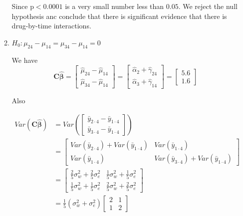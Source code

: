 \documentclass{article}
\begin{document}
\begin{enumerate}[leftmargin = 0 em, label = \arabic*., font = \bfseries]
\begin{enumerate}
		Since p$< 0.0001$ is a very small number less than $0.05$. We reject the null hypothesis anc conclude that there is significant evidence that there is drug-by-time interactions. 

		\item 
		$H_0 : \mu_{24} - \mu_{14} = \mu_{34} - \mu_{14} = 0$

		We have
		\[\bm C \hat{\bm \beta} = \begin{bmatrix}
			\hat{\mu}_{24} - \hat{\mu}_{14} \\
			\hat{\mu}_{34} - \hat{\mu}_{14}
		\end{bmatrix}  =\begin{bmatrix}
			\hat{\alpha}_2 + \hat{\gamma}_{24}\\
			\hat{\alpha}_3 + \hat{\gamma}_{14}
		\end{bmatrix} = \begin{bmatrix}
			5.6 \\ 1.6
		\end{bmatrix}\]

		Also

		\begin{align*}
		Var \left( \bm C \hat{\bm \beta}\right) & = Var \left(  \begin{bmatrix}
			\bar{y}_{2 \cdot 4} - \bar{y}_{1 \cdot 4}\\
			\bar{y}_{3 \cdot 4} - \bar{y}_{1 \cdot 4}
		\end{bmatrix} \right)  \\
		& = \begin{bmatrix}
			Var(\bar{y}_{2 \cdot 4}) + Var(\bar{y}_{1 \cdot 4}) & Var(\bar{y}_{1 \cdot 4})\\
			Var(\bar{y}_{1 \cdot 4}) & Var(\bar{y}_{3 \cdot 4}) + Var(\bar{y}_{1 \cdot 4})
		\end{bmatrix}\\
		& = \begin{bmatrix}
			\frac{2}{5} \sigma_w^2 + \frac{2}{5} \sigma_e^2 & \frac{1}{5} \sigma_w^2 + \frac{1}{5} \sigma_e^2\\
			\frac{1}{5} \sigma_w^2 + \frac{1}{5} \sigma_e^2 & \frac{2}{5} \sigma_w^2 + \frac{2}{5} \sigma_e^2 
		\end{bmatrix}\\
		& = \frac{1}{5} (\sigma_w^2 + \sigma_e^2) \begin{bmatrix}
			2 & 1 \\
			1 & 2
		\end{bmatrix}
		\end{align*}


\end{enumerate}
\end{enumerate}
\end{document}
